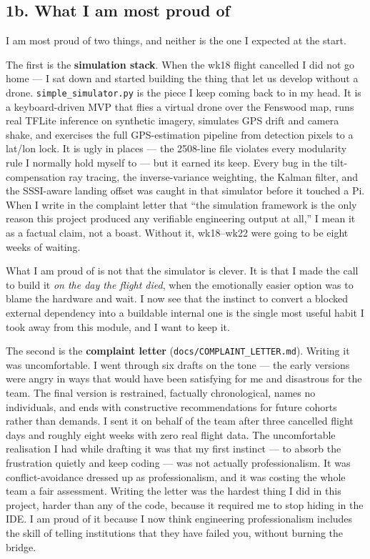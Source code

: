 \subsection*{1b. What I am most proud of}

I am most proud of two things, and neither is the one I expected at the start.

The first is the \textbf{simulation stack}. When the wk18 flight cancelled I did not go home --- I sat down and started building the thing that let us develop without a drone. \texttt{simple\_simulator.py} is the piece I keep coming back to in my head. It is a keyboard-driven MVP that flies a virtual drone over the Fenswood map, runs real TFLite inference on synthetic imagery, simulates GPS drift and camera shake, and exercises the full GPS-estimation pipeline from detection pixels to a lat/lon lock. It is ugly in places --- the 2508-line file violates every modularity rule I normally hold myself to --- but it earned its keep. Every bug in the tilt-compensation ray tracing, the inverse-variance weighting, the Kalman filter, and the SSSI-aware landing offset was caught in that simulator before it touched a Pi. When I write in the complaint letter that ``the simulation framework is the only reason this project produced any verifiable engineering output at all,'' I mean it as a factual claim, not a boast. Without it, wk18--wk22 were going to be eight weeks of waiting.

What I am proud of is not that the simulator is clever. It is that I made the call to build it \emph{on the day the flight died}, when the emotionally easier option was to blame the hardware and wait. I now see that the instinct to convert a blocked external dependency into a buildable internal one is the single most useful habit I took away from this module, and I want to keep it.

The second is the \textbf{complaint letter} (\texttt{docs/COMPLAINT\_LETTER.md}). Writing it was uncomfortable. I went through six drafts on the tone --- the early versions were angry in ways that would have been satisfying for me and disastrous for the team. The final version is restrained, factually chronological, names no individuals, and ends with constructive recommendations for future cohorts rather than demands. I sent it on behalf of the team after three cancelled flight days and roughly eight weeks with zero real flight data. The uncomfortable realisation I had while drafting it was that my first instinct --- to absorb the frustration quietly and keep coding --- was not actually professionalism. It was conflict-avoidance dressed up as professionalism, and it was costing the whole team a fair assessment. Writing the letter was the hardest thing I did in this project, harder than any of the code, because it required me to stop hiding in the IDE. I am proud of it because I now think engineering professionalism includes the skill of telling institutions that they have failed you, without burning the bridge.

